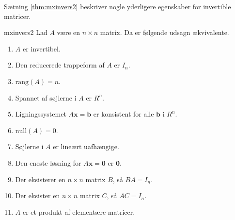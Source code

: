 Sætning \ref{thm:mxinvers2} beskriver nogle yderligere egenskaber for invertible matricer. 
%
\begin{thm}{}{mxinvers2}
Lad $A$ være en $n \times n$ matrix. 
Da er følgende udsagn ækvivalente.
\begin{enumerate}[label=(\alph*)]
\item $A$ er invertibel.
\item Den reducerede trappeform af $A$ er $I_n$.
\item $\text{rang}(A)=n$.
\item Spannet af søjlerne i $A$ er $R^n$.
\item Ligningssystemet $A\textbf{x}=\textbf{b}$ er konsistent for alle $\textbf{b}$ i $R^n$.
\item $\text{null}(A)=0$.
\item Søjlerne i $A$ er lineært uafhængige.
\item Den eneste løsning for $A\textbf{x}=\textbf{0}$ er $\textbf{0}$.
\item Der eksisterer en $n \times n$ matrix $B$, så $BA=I_n$.
\item Der eksister en $n \times n$ matrix $C$, så $AC=I_n$.
\item $A$ er et produkt af elementære matricer.
\end{enumerate}
\end{thm}
